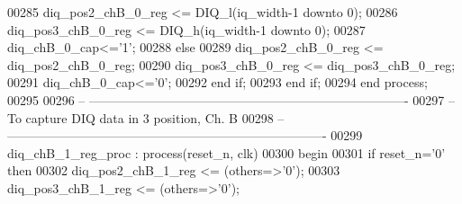 \begin{DoxyCode}
00285             \textcolor{vhdlchar}{diq_pos2_chB_0_reg} \textcolor{vhdlchar}{<=} \textcolor{vhdlchar}{DIQ_l}\textcolor{vhdlchar}{(}\textcolor{vhdlchar}{iq_width}\textcolor{vhdlchar}{-}\textcolor{vhdllogic}{}\textcolor{vhdllogic}{1} \textcolor{keywordflow}{downto} \textcolor{vhdllogic}{}\textcolor{vhdllogic}{0}\textcolor{vhdlchar}{)};
00286             \textcolor{vhdlchar}{diq_pos3_chB_0_reg} \textcolor{vhdlchar}{<=} \textcolor{vhdlchar}{DIQ_h}\textcolor{vhdlchar}{(}\textcolor{vhdlchar}{iq_width}\textcolor{vhdlchar}{-}\textcolor{vhdllogic}{}\textcolor{vhdllogic}{1} \textcolor{keywordflow}{downto} \textcolor{vhdllogic}{}\textcolor{vhdllogic}{0}\textcolor{vhdlchar}{)};
00287             \textcolor{vhdlchar}{diq_chB_0_cap}\textcolor{vhdlchar}{<=}\textcolor{vhdlchar}{'}\textcolor{vhdllogic}{}\textcolor{vhdllogic}{1}\textcolor{vhdlchar}{'};
00288             \textcolor{keywordflow}{else} 
00289                 \textcolor{vhdlchar}{diq_pos2_chB_0_reg} \textcolor{vhdlchar}{<=} \textcolor{vhdlchar}{diq_pos2_chB_0_reg};
00290                 \textcolor{vhdlchar}{diq_pos3_chB_0_reg} \textcolor{vhdlchar}{<=} \textcolor{vhdlchar}{diq_pos3_chB_0_reg};
00291             \textcolor{vhdlchar}{diq_chB_0_cap}\textcolor{vhdlchar}{<=}\textcolor{vhdlchar}{'}\textcolor{vhdllogic}{}\textcolor{vhdllogic}{0}\textcolor{vhdlchar}{'};
00292             \textcolor{keywordflow}{end} \textcolor{keywordflow}{if}; 
00293         \textcolor{keywordflow}{end} \textcolor{keywordflow}{if};
00294     \textcolor{keywordflow}{end} \textcolor{keywordflow}{process};
00295 
00296 \textcolor{keyword}{-- ----------------------------------------------------------------------------}
00297 \textcolor{keyword}{-- To capture DIQ data in 3 position, Ch. B}
00298 \textcolor{keyword}{-- ----------------------------------------------------------------------------}
00299  diq\_chB\_1\_reg\_proc : \textcolor{keywordflow}{process}(reset_n, clk)
00300 \textcolor{vhdlkeyword}{    begin}
00301       \textcolor{keywordflow}{if} \textcolor{vhdlchar}{reset_n}\textcolor{vhdlchar}{=}\textcolor{vhdlchar}{'}\textcolor{vhdllogic}{}\textcolor{vhdllogic}{0}\textcolor{vhdlchar}{'} \textcolor{keywordflow}{then}
00302          \textcolor{vhdlchar}{diq_pos2_chB_1_reg} \textcolor{vhdlchar}{<=} \textcolor{vhdlchar}{(}\textcolor{keywordflow}{others}\textcolor{vhdlchar}{=}\textcolor{vhdlchar}{>}\textcolor{vhdlchar}{'}\textcolor{vhdllogic}{}\textcolor{vhdllogic}{0}\textcolor{vhdlchar}{'}\textcolor{vhdlchar}{)};
00303          \textcolor{vhdlchar}{diq_pos3_chB_1_reg} \textcolor{vhdlchar}{<=} \textcolor{vhdlchar}{(}\textcolor{keywordflow}{others}\textcolor{vhdlchar}{=}\textcolor{vhdlchar}{>}\textcolor{vhdlchar}{'}\textcolor{vhdllogic}{}\textcolor{vhdllogic}{0}\textcolor{vhdlchar}{'}\textcolor{vhdlchar}{)};

\end{DoxyCode}
